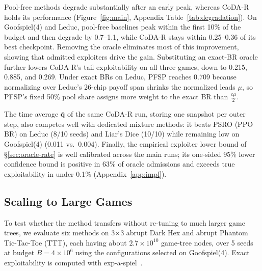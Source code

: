 \documentclass{article}
\theoremstyle{plain}
\theoremstyle{remark}
\newcommand{\bq}{{\bm{q}}}
\newcommand{\codar}{CoDA-R}
\begin{document}
Pool-free methods degrade substantially after an early peak, whereas \codar{} holds its performance (Figure~\ref{fig:main}, Appendix Table~\ref{tab:degradation}). On Goofspiel(4) and Leduc, pool-free baselines peak within the first 10\% of the budget and then degrade by 0.7--1.1, while \codar{} stays within 0.25--0.36 of its best checkpoint. Removing the oracle eliminates most of this improvement, showing that admitted exploiters drive the gain. Substituting an exact-BR oracle further lowers \codar{}'s tail exploitability on all three games, down to 0.215, 0.885, and 0.269. Under exact BRs on Leduc, PFSP reaches 0.709 because normalizing over Leduc's 26-chip payoff span shrinks the normalized leads $\mu$, so PFSP's fixed 50\% pool share assigns more weight to the exact BR than $\tfrac{c\mu}2$.

The time average $\bar{\bq}$ of the same \codar{} run, storing one snapshot per outer step, also competes well with dedicated mixture methods: it beats PSRO (PPO BR) on Leduc (8/10 seeds) and Liar's Dice (10/10) while remaining low on Goofspiel(4) (0.011 vs.\ 0.004). Finally, the empirical exploiter lower bound of \S\ref{sec:oracle-rate} is well calibrated across the main runs; its one-sided 95\% lower confidence bound is positive in 63\% of oracle admissions and exceeds true exploitability in under 0.1\% (Appendix~\ref{app:impl}).

\subsection{Scaling to Large Games}
\label{sec:exp-scale}

To test whether the method transfers without re-tuning to much larger game trees, we evaluate six methods on 3$\times$3 abrupt Dark Hex and abrupt Phantom Tic-Tac-Toe (TTT), each having about $2.7\times10^{10}$ game-tree nodes, over 5 seeds at budget $B=4\times10^6$ using the configurations selected on Goofspiel(4). Exact exploitability is computed with exp-a-spiel~\citep{rudolph2025reevaluating}.
\end{document}
